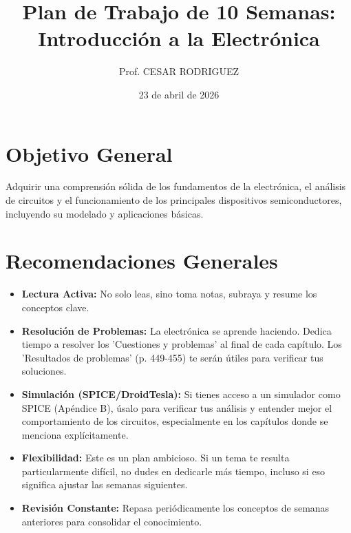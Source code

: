 \documentclass[12pt, a4paper]{article}
\title{\textbf{Plan de Trabajo de 10 Semanas:\\ Introducción a la Electrónica}}
\author{Prof. CESAR RODRIGUEZ}
\date{23 de abril de 2026}
\begin{document}
\maketitle

\section*{Objetivo General}
Adquirir una comprensión sólida de los fundamentos de la electrónica, el análisis de circuitos y el funcionamiento de los principales dispositivos semiconductores, incluyendo su modelado y aplicaciones básicas.

\section*{Recomendaciones Generales}
\begin{itemize}[leftmargin=*]
    \item \textbf{Lectura Activa:} No solo leas, sino toma notas, subraya y resume los conceptos clave.
    \item \textbf{Resolución de Problemas:} La electrónica se aprende haciendo. Dedica tiempo a resolver los 'Cuestiones y problemas' al final de cada capítulo. Los 'Resultados de problemas' (p. 449-455) te serán útiles para verificar tus soluciones.
    \item \textbf{Simulación (SPICE/DroidTesla):} Si tienes acceso a un simulador como SPICE (Apéndice B), úsalo para verificar tus análisis y entender mejor el comportamiento de los circuitos, especialmente en los capítulos donde se menciona explícitamente.
    \item \textbf{Flexibilidad:} Este es un plan ambicioso. Si un tema te resulta particularmente difícil, no dudes en dedicarle más tiempo, incluso si eso significa ajustar las semanas siguientes.
    \item \textbf{Revisión Constante:} Repasa periódicamente los conceptos de semanas anteriores para consolidar el conocimiento.
\end{itemize}

\newpage
\end{document}
